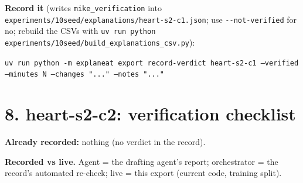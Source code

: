 \documentclass[a4paper,11pt]{article}
\begin{document}
\textbf{Record it} (writes \texttt{mike\_verification} into \texttt{experiments/10seed/explanations/heart-s2-c1.json}; use \texttt{-{}-not-verified} for no; rebuild the CSVs with \texttt{uv run python experiments/10seed/build\_explanations\_csv.py}):

{\footnotesize\raggedright\texttt{uv run python -m explaneat export record-verdict heart-s2-c1 --verified --minutes N --changes "..." --notes "..."}\par}


\clearpage














\clearpage
\section*{8. heart-s2-c2: verification checklist}
\label{rev:heart-s2-c2}
\textbf{Already recorded:} nothing (no verdict in the record).

\textbf{Recorded vs live.} Agent = the drafting agent's report; orchestrator = the record's automated re-check; live = this export (current code, training split).
\end{document}
